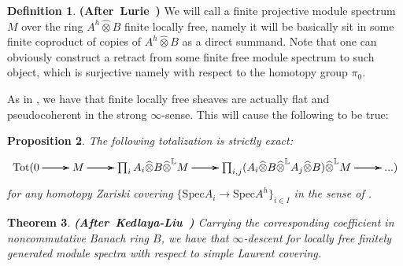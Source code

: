 \documentclass[12pt]{amsart}
\newtheorem{theorem}{Theorem}[section]
\newtheorem{proposition}[theorem]{Proposition}
\theoremstyle{definition}
\newtheorem{definition}[theorem]{Definition}
\numberwithin{equation}{section}
\begin{document}
\begin{definition} \mbox{\bf{(After Lurie \cite[Definition 2.9.1.1]{Lu1})}} We will call a finite projective module spectrum $M$ over the ring $A^h\widehat{\otimes}B$ finite locally free, namely it will be basically sit in some finite coproduct of copies of $A^h\widehat{\otimes}B$ as a direct summand. Note that one can obviously construct a retract from some finite free module spectrum to such object, which is surjective namely with respect to the homotopy group $\pi_0$.
	
\end{definition}


\indent As in \cite[Proposition 7.2.4.20]{Lu2}, we have that finite locally free sheaves are actually flat and pseudocoherent in the strong $\infty$-sense. This will cause the following to be true:



\begin{proposition} 
The following totalization is strictly exact:
\[
\xymatrix@C+0pc@R+0pc{
\mathrm{Tot}(0  \ar[r]\ar[r]\ar[r] &M \ar[r]\ar[r]\ar[r] & \prod_i A_i\widehat{\otimes} B \widehat{\otimes}^\mathbb{L} M  \ar[r]\ar[r]\ar[r] &\prod_{i,j} (A_i\widehat{\otimes} B \widehat{\otimes}^\mathbb{L} A_j\widehat{\otimes}B) \widehat{\otimes}^\mathbb{L} M\ar[r]\ar[r]\ar[r] &...)
}
\]
for any homotopy Zariski covering $\{\mathrm{Spec}A_i\rightarrow \mathrm{Spec}A^h\}_{i\in I}$ in the sense of \cite[Theorem 2.15, Theorem 4.15]{BK1}. 
\end{proposition}





\begin{theorem} \mbox{\bf{(After Kedlaya-Liu \cite[Theorem 2.7.7]{KL1})}}
Carrying the corresponding coefficient in noncommutative Banach ring $B$, we have that $\infty$-descent for locally free finitely generated module spectra with respect to simple Laurent covering.	
\end{theorem}
\end{document}
